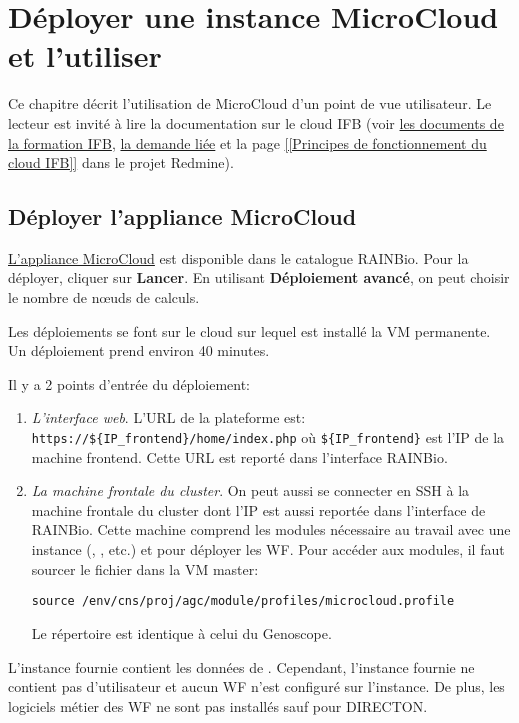 \chapter{Déployer une instance MicroCloud et l'utiliser} \label{chap:deploiement}

Ce chapitre décrit l'utilisation de MicroCloud d'un point de vue utilisateur.
Le lecteur est invité à lire la documentation sur le cloud IFB
(voir \href{https://intranet.genoscope.cns.fr/agc/redmine/documents/86}{les documents de la formation IFB},
\href{https://intranet.genoscope.cns.fr/agc/redmine/issues/6010}{la demande liée}
et la page \href{https://intranet.genoscope.cns.fr/agc/redmine/projects/microcloud/wiki/Principes_de_fonctionnement_du_cloud_IFB}{[[Principes de fonctionnement du cloud IFB]]}
dans le projet Redmine).

\section{Déployer l'appliance MicroCloud}

\href{https://biosphere.france-bioinformatique.fr/catalogue/appliance/150/}{L'appliance MicroCloud} est disponible dans le catalogue RAINBio.
Pour la déployer, cliquer sur \textbf{Lancer}.
En utilisant \textbf{Déploiement avancé}, on peut choisir le nombre de nœuds de calculs.

Les déploiements se font sur le cloud  sur lequel est installé la VM permanente.
Un déploiement prend environ 40 minutes.


Il y a 2 points d'entrée du déploiement:
\begin{enumerate}
    \item \emph{L'interface web}. L'URL de la plateforme est: \nolinkurl{https://${IP_frontend}/home/index.php} où \nolinkurl{${IP_frontend}}
          est l'IP de la machine frontend.
          Cette URL est reporté dans l'interface RAINBio.
    \item \emph{La machine frontale du cluster}. On peut aussi se connecter en SSH à la machine frontale du cluster
          dont l'IP est aussi reportée dans l'interface de RAINBio.
          Cette machine comprend les modules nécessaire au travail avec une instance (, , etc.)
          et  pour déployer les WF.
          Pour accéder aux modules, il faut sourcer le fichier  dans la VM master:
          \begin{lstlisting}[style=bash,gobble=14]
              source /env/cns/proj/agc/module/profiles/microcloud.profile
          \end{lstlisting}
            Le répertoire  est identique à celui du Genoscope.
\end{enumerate}
L'instance fournie contient les données de \theOrg{}.
Cependant, l'instance fournie ne contient pas d'utilisateur
et aucun WF n'est configuré sur l'instance.
De plus, les logiciels métier des WF ne sont pas installés
sauf pour DIRECTON.

